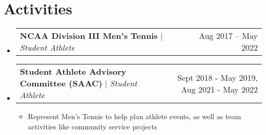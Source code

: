 \documentclass[letterpaper,11pt]{article}
\makeatletter
\newcommand{\resumeItem}[1]{
  \item\small{
    {#1 \vspace{-2pt}}
  }
}
\newcommand{\resumeProjectHeading}[2]{
    \item
    \begin{tabular*}{0.97\textwidth}{l@{\extracolsep{\fill}}r}
      \small#1 & #2 \\
    \end{tabular*}\vspace{-7pt}
}
\newcommand{\resumeSubHeadingListStart}{\begin{itemize}[leftmargin=0.15in, label={}]}
\newcommand{\resumeSubHeadingListEnd}{\end{itemize}}
\newcommand{\resumeItemListStart}{\begin{itemize}}
\newcommand{\resumeItemListEnd}{\end{itemize}\vspace{-5pt}}
\makeatother
\begin{document}
\section{Activities}
 \resumeSubHeadingListStart
      \resumeProjectHeading
          {\textbf{NCAA Division III Men's Tennis} $|$ \emph{Student Athlete}}{Aug 2017 -- May 2022}
      \resumeProjectHeading
          {\textbf{Student Athlete Advisory Committee (SAAC)} $|$ \emph{Student Athlete}}{Sept 2018 - May 2019, Aug 2021 - May 2022}
          \resumeItemListStart
            \resumeItem{Represent Men's Tennis to help plan athlete events, as well as team activities like community service projects}
          \resumeItemListEnd
    \resumeSubHeadingListEnd

\end{document}
